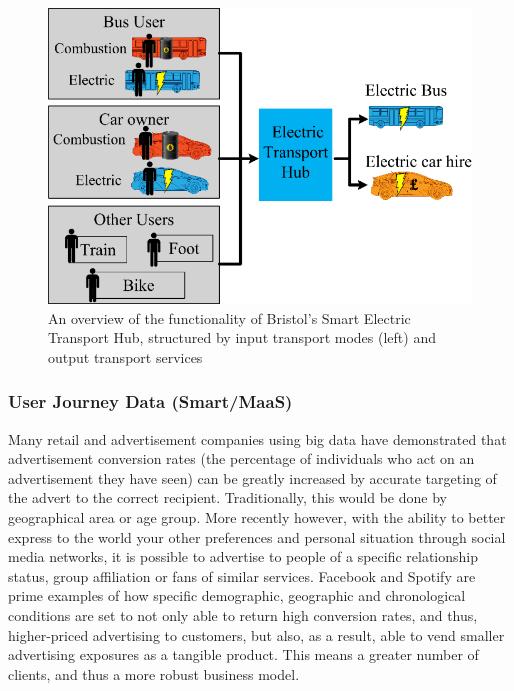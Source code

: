 \documentclass[journal]{IEEEtran}
\begin{document}
\begin{figure}[!htb]
\centering
\includegraphics[width=\columnwidth]{images/bristolhub.png}
\caption{An overview of the functionality of Bristol's Smart Electric
  Transport Hub, structured by input transport modes (left) and output
  transport services}
\label{fig:bristolhub}
\end{figure}


\subsubsection{User Journey Data (Smart/MaaS)}

Many retail and advertisement companies using big data have
demonstrated that advertisement conversion rates (the percentage of
individuals who act on an advertisement they have seen) can be greatly
increased by accurate targeting of the advert to the correct
recipient. Traditionally, this would be done by geographical area or
age group. More recently however, with the ability to better express
to the world your other preferences and personal situation through
social media networks, it is possible to advertise to people of a
specific relationship status, group affiliation or fans of similar
services. Facebook and Spotify are prime examples of how specific
demographic, geographic and chronological conditions are set to not
only able to return high conversion rates, and thus, higher-priced
advertising to customers, but also, as a result, able to vend smaller
advertising exposures as a tangible product. This means a greater
number of clients, and thus a more robust business model.
\end{document}
